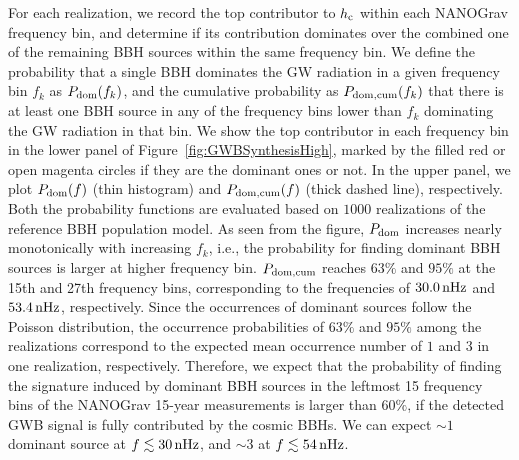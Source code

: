 \documentclass[twocolumn]{aastex631}
\newcommand{\rmc}{_{\rm c}}
\newcommand{\nhz}{{\rm\,nHz}}
\begin{document}
For each realization, we record the top contributor to $h\rmc$ within each
NANOGrav frequency bin, and determine if its contribution dominates over the
combined one of the remaining BBH sources within the same frequency bin. We
define the probability that a single BBH dominates the GW radiation in a given
frequency bin $f_k$ as $P_{\rm dom}(f_k)$, and the cumulative probability as
$P_{\rm dom,cum}(f_k)$ that there is at least one BBH source in any of the
frequency bins lower than $f_k$ dominating the GW radiation in that bin. We show
the top contributor in each frequency bin in the lower panel of
Figure~\ref{fig:GWBSynthesisHigh}, marked by the filled red or open magenta
circles if they are the dominant ones or not. In the upper panel, we plot
$P_{\rm dom}(f)$ (thin histogram) and $P_{\rm dom,cum}(f)$ (thick dashed line),
respectively. Both the probability functions are evaluated based on $1000$
realizations of the reference BBH population model. As seen from the figure,
$P_{\rm dom}$ increases nearly monotonically with increasing $f_k$, i.e., the
probability for finding dominant BBH sources is larger at higher frequency bin.
$P_{\rm dom,cum}$ reaches $63\%$ and $95\%$ at the 15th and 27th frequency bins,
corresponding to the frequencies of $30.0\nhz$ and $53.4\nhz$, respectively.
Since the occurrences of dominant sources follow the Poisson distribution, the
occurrence probabilities of $63\%$ and $95\%$ among the realizations correspond
to the expected mean occurrence number of $1$ and $3$ in one realization,
respectively. Therefore, we expect that the probability of finding the signature
induced by dominant BBH sources in the leftmost 15 frequency bins of the
NANOGrav 15-year measurements is larger than $60\%$, if the detected GWB signal
is fully contributed by the cosmic BBHs. We can expect $\sim 1$ dominant source
at $f\lesssim 30\nhz$, and $\sim 3$ at $f\lesssim 54\nhz$.
\end{document}
